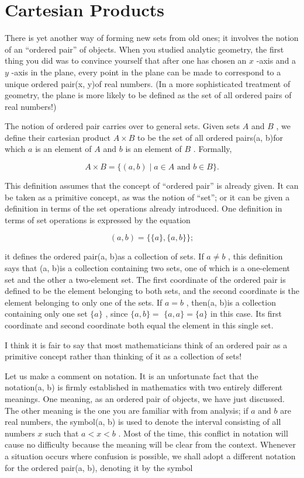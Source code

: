 \section*{Cartesian Products}

There is yet another way of forming new sets from old ones; it involves the notion of an ``ordered pair'' of objects. When you studied analytic geometry, the first thing you did was to convince yourself that after one has chosen an \(x\) -axis and a \(y\) -axis in the plane, every point in the plane can be made to correspond to a unique ordered pair(x, y)of real numbers. (In a more sophisticated treatment of geometry, the plane is more likely to be defined as the set of all ordered pairs of real numbers!)

The notion of ordered pair carries over to general sets. Given sets \(A\) and \(B\) , we define their cartesian product \(A \times  B\) to be the set of all ordered pairs(a, b)for which \(a\) is an element of \(A\) and \(b\) is an element of \(B\) . Formally,

\[
A \times  B = \{ \left( {a,b}\right)  \mid  a \in  A\text{ and }b \in  B\} .
\]

This definition assumes that the concept of ``ordered pair'' is already given. It can be taken as a primitive concept, as was the notion of ``set''; or it can be given a definition in terms of the set operations already introduced. One definition in terms of set operations is expressed by the equation

\[
\left( {a,b}\right)  = \{ \{ a\} ,\{ a,b\} \} ;
\]

it defines the ordered pair(a, b)as a collection of sets. If \(a \neq  b\) , this definition says that (a, b)is a collection containing two sets, one of which is a one-element set and the other a two-element set. The first coordinate of the ordered pair is defined to be the element belonging to both sets, and the second coordinate is the element belonging to only one of the sets. If \(a = b\) , then(a, b)is a collection containing only one set \(\{ a\}\) , since \(\{ a,b\}  =\)  \(\{ a,a\}  = \{ a\}\) in this case. Its first coordinate and second coordinate both equal the element in this single set.

I think it is fair to say that most mathematicians think of an ordered pair as a primitive concept rather than thinking of it as a collection of sets!

Let us make a comment on notation. It is an unfortunate fact that the notation(a, b) is firmly established in mathematics with two entirely different meanings. One meaning, as an ordered pair of objects, we have just discussed. The other meaning is the one you are familiar with from analysis; if \(a\) and \(b\) are real numbers, the symbol(a, b) is used to denote the interval consisting of all numbers \(x\) such that \(a < x < b\) . Most of the time, this conflict in notation will cause no difficulty because the meaning will be clear from the context. Whenever a situation occurs where confusion is possible, we shall adopt a different notation for the ordered pair(a, b), denoting it by the symbol


